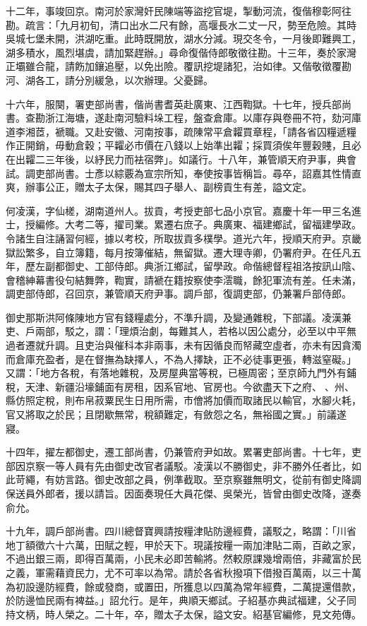 \begin{pinyinscope}
十二年，事竣回京。南河於家灣奸民陳端等盜挖官堤，掣動河流，復偕穆彰阿往勘。疏言：「九月初旬，清口出水二尺有餘，高堰長水二丈一尺，勢至危險。其時吳城七堡未開，洪湖吃重。此時既開放，湖水分減。現交冬令，一月後即難興工，湖多積水，風烈堪虞，請加緊趕辦。」尋命復偕侍郎敬徵往勘。十三年，奏於家灣正壩雖合龍，請飭加鑲追壓，以免出險。覆訊挖堤諸犯，治如律。又偕敬徵覆勘河、湖各工，請分別緩急，以次辦理。父憂歸。

十六年，服闋，署吏部尚書，偕尚書耆英赴廣東、江西鞫獄。十七年，授兵部尚書。查勘浙江海塘，遂赴南河驗料垛工程，盤查倉庫。以庫存與卷冊不符，劾河庫道李湘茝，褫職。又赴安徽、河南按事，疏陳常平倉糶買章程，「請各省囚糧遞糧作正開銷，毋動倉穀；平糶必市價在八錢以上始準出糶；採買須俟年豐穀賤，且必在出糶二三年後，以紓民力而袪宿弊」。如議行。十八年，兼管順天府尹事，典會試。調吏部尚書。士彥以綜覈為宣宗所知，奉使按事皆稱旨。尋卒，詔嘉其性情直爽，辦事公正，贈太子太保，賜其四子舉人、副榜貢生有差，謚文定。

何凌漢，字仙槎，湖南道州人。拔貢，考授吏部七品小京官。嘉慶十年一甲三名進士，授編修。大考二等，擢司業。累遷右庶子。典廣東、福建鄉試，留福建學政。令諸生自注誦習何經，據以考校，所取拔貢多樸學。道光六年，授順天府尹。京畿獄訟繁多，自立簿籍，每月按簿催結，無留獄。遷大理寺卿，仍署府尹。在任凡五年，歷左副都御史、工部侍郎。典浙江鄉試，留學政。命偕總督程祖洛按訊山陰、會稽紳幕書役句結舞弊，鞫實，請褫在籍按察使李澐職，餘犯軍流有差。任未滿，調吏部侍郎，召回京，兼管順天府尹事。調戶部，復調吏部，仍兼署戶部侍郎。

御史那斯洪阿條陳地方官有錢糧處分，不準升調，及變通雜稅，下部議。凌漢兼吏、戶兩部，駁之，謂：「理煩治劇，每難其人，若格以因公處分，必至以中平無過者遷就升調。且吏治與催科本非兩事，未有因循良而帑藏空虛者，亦未有因貪濁而倉庫充盈者，是在督撫為缺擇人，不為人擇缺，正不必徒事更張，轉滋窒礙。」又謂：「地方各稅，有落地雜稅，及房屋典當等稅，已極周密；至京師九門外有鋪稅，天津、新疆沿壕鋪面有房租，因系官地、官房也。今欲盡天下之府、、州、縣仿照定稅，則布帛菽粟民生日用所需，市儈將加價而取諸民以輸官，水腳火耗，官又將取之於民；且閉歇無常，稅額難定，有斂怨之名，無裕國之實。」前議遂寢。

十四年，擢左都御史，遷工部尚書，仍兼管府尹如故。累署吏部尚書。十七年，吏部因京察一等人員有先由御史改官者議駁。凌漢以不勝御史，非不勝外任者比，如此苛繩，有妨言路。御史改部之員，例準截取。至京察雖無明文，從前有御史降調保送員外郎者，援以請旨。因面奏現任大員花傑、吳榮光，皆曾由御史改降，遂奏俞允。

十九年，調戶部尚書。四川總督寶興請按糧津貼防邊經費，議駁之，略謂：「川省地丁額徵六十六萬，田賦之輕，甲於天下。現議按糧一兩加津貼二兩，百畝之家，不過出銀三兩，即得百萬兩，小民未必即苦輸將。然較原課幾增兩倍，非藏富於民之義，軍需藉資民力，尤不可率以為常。請於各省秋撥項下借撥百萬兩，以三十萬為初設邊防經費，餘或發商，或置田，所獲息以四萬為常年經費，二萬提還借款，於防邊恤民兩有裨益。」詔允行。是年，典順天鄉試。子紹基亦典試福建，父子同持文柄，時人榮之。二十年，卒，贈太子太保，謚文安。紹基官編修，見文苑傳。


\end{pinyinscope}
